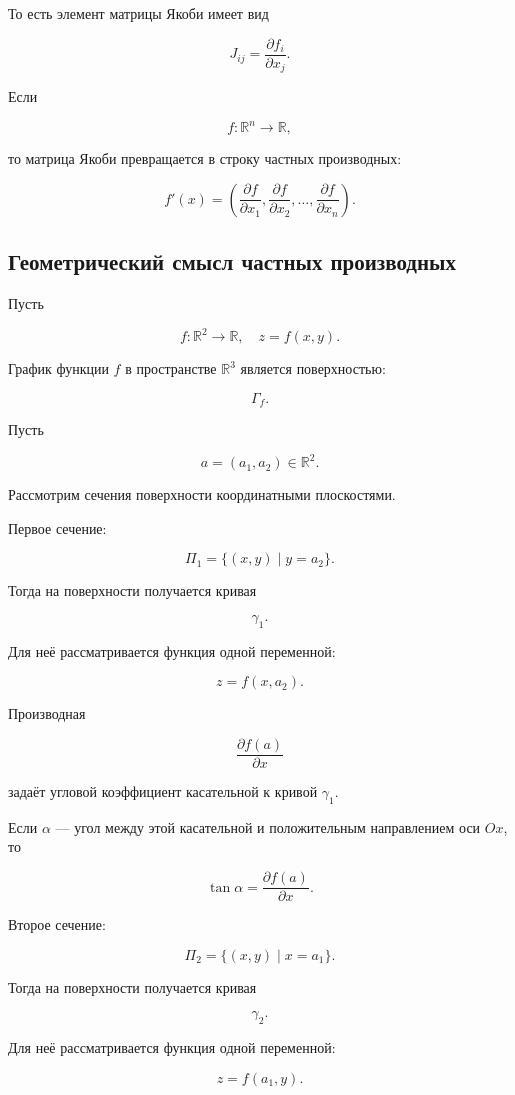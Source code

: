 \documentclass[a4paper,12pt]{article}
\begin{document}
То есть элемент матрицы Якоби имеет вид

\[
J_{ij}
=
\frac{\partial f_i}{\partial x_j}.
\]

Если

\[
f:\mathbb{R}^n\to\mathbb{R},
\]

то матрица Якоби превращается в строку частных производных:

\[
f'(x)
=
\left(
\frac{\partial f}{\partial x_1},
\frac{\partial f}{\partial x_2},
\ldots,
\frac{\partial f}{\partial x_n}
\right).
\]

\subsection*{Геометрический смысл частных производных}

Пусть

\[
f:\mathbb{R}^2\to\mathbb{R},
\quad
z=f(x,y).
\]

График функции $f$ в пространстве $\mathbb{R}^3$ является поверхностью:

\[
\Gamma_f.
\]

Пусть

\[
a=(a_1,a_2)\in\mathbb{R}^2.
\]

Рассмотрим сечения поверхности координатными плоскостями.

Первое сечение:

\[
\Pi_1=\{(x,y)\mid y=a_2\}.
\]

Тогда на поверхности получается кривая

\[
\gamma_1.
\]

Для неё рассматривается функция одной переменной:

\[
z=f(x,a_2).
\]

Производная

\[
\frac{\partial f(a)}{\partial x}
\]

задаёт угловой коэффициент касательной к кривой $\gamma_1$.

Если $\alpha$ — угол между этой касательной и положительным направлением оси $Ox$, то

\[
\tan\alpha
=
\frac{\partial f(a)}{\partial x}.
\]

Второе сечение:

\[
\Pi_2=\{(x,y)\mid x=a_1\}.
\]

Тогда на поверхности получается кривая

\[
\gamma_2.
\]

Для неё рассматривается функция одной переменной:

\[
z=f(a_1,y).
\]
\end{document}
